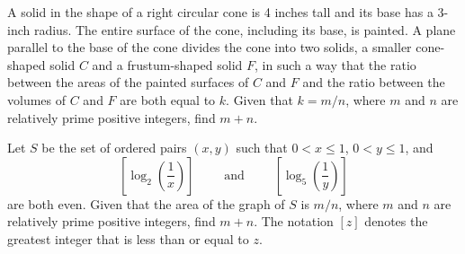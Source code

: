 %	





















\begin{question}[name={2004 AIME I, \href{https://artofproblemsolving.com/community/c4p378108}{Problem 11}}]
	A solid in the shape of a right circular cone is 4 inches tall and its base has a 3-inch radius. The entire surface of the cone, including its base, is painted. A plane parallel to the base of the cone divides the cone into two solids, a smaller cone-shaped solid $C$ and a frustum-shaped solid $F$, in such a way that the ratio between the areas of the painted surfaces of $C$ and $F$ and the ratio between the volumes of $C$ and $F$ are both equal to $k$. Given that $k=m/n$, where $m$ and $n$ are relatively prime positive integers, find $m+n$.
\end{question}


%	












\begin{question}[name={2004 AIME I, \href{https://artofproblemsolving.com/community/c4p378123}{Problem 12}}]
	Let $S$ be the set of ordered pairs $(x, y)$ such that $0<x\le 1$, $0<y\le 1$, and $$\left[\log_2{\left(\frac 1x\right)}\right] \qquad \text{ and } \qquad \left[\log_5{\left(\frac 1y\right)}\right]$$ are both even. Given that the area of the graph of $S$ is $m/n$, where $m$ and $n$ are relatively prime positive integers, find $m+n$. The notation $[z]$ denotes the greatest integer that is less than or equal to $z$.
\end{question}


%	







